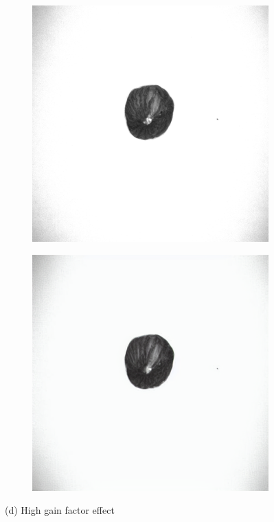 \documentclass[12pt,DIV14,BCOR12mm,a4paper,footinclude=false,headinclude,parskip=half-,twoside,openright,cleardoublepage=empty,toc=index,bibliography=totoc,listof=totoc]{scrreprt}
\numberwithin{equation}{chapter}
\begin{document}
\begin{figure}
    \vspace{0.3cm} %

    \begin{subfigure}[t]{0.24\textwidth}
        \centering
        \includegraphics[width=\textwidth]{../media/diff_nuts_high_real.png}
    \end{subfigure}%
    \hspace{0.02\textwidth}
    \begin{subfigure}[t]{0.24\textwidth}
        \centering
        \includegraphics[width=\textwidth]{../media/diff_nuts_high_fake.png}
    \end{subfigure}
    \caption*{(d) High gain factor effect}


\end{figure}
\end{document}
